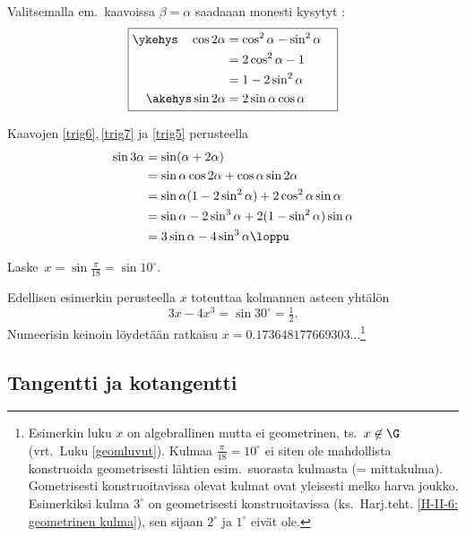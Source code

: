 Valitsemalla em.\ kaavoissa $\beta = \alpha$ saadaaan monesti kysytyt
:
\begin{equation} \label{trig7} \boxed{ \begin{aligned}
\ykehys\quad \cos 2\alpha &= \cos^2\alpha-\sin^2\alpha \quad \\ 
                          &= 2\cos^2 \alpha - 1 \\
                          &= 1-2\sin^2\alpha \quad \\
     \akehys \sin 2\alpha &= 2\sin \alpha \cos \alpha
\end{aligned} } \end{equation}
\begin{Exa} \label{sin kolme alpha} Kaavojen \eqref{trig6},\,\eqref{trig7} ja \eqref{trig5}
perusteella
\begin{align*}
\sin 3\alpha &= \sin (\alpha + 2\alpha) \\
&= \sin \alpha \cos 2\alpha + \cos \alpha \sin 2\alpha \\
&= \sin \alpha(1-2\sin^2 \alpha) + 2\cos^2 \alpha \sin \alpha \\
&= \sin \alpha - 2\sin^3 \alpha + 2(1-\sin^2 \alpha) \sin \alpha \\
&= 3\sin\alpha - 4\sin^3\alpha \loppu
\end{align*}
\end{Exa}
\begin{Exa} \label{kulman kolmijako}
Laske $\,x = \sin\frac{\pi}{18} = \sin 10^{\circ}$.
\end{Exa}
\ratk Edellisen esimerkin perusteella $x$ toteuttaa kolmannen asteen yhtälön
\[
3x - 4x^3 = \sin 30^{\circ} = \tfrac{1}{2}.
\]
Numeerisin keinoin löydetään ratkaisu $x=0.173648177669303 \ldots$\footnote[1]{Esimerkin luku
$x$ on algebrallinen mutta ei geometrinen, ts.\ $x \not\in\G$ (vrt.\ Luku \ref{geomluvut}). 
Kulmaa $\frac{\pi}{18} = 10^{\circ}$ ei siten ole mahdollista konstruoida geometrisesti lähtien
esim.\ suorasta kulmasta (= mittakulma). Gometrisesti konstruoitavissa olevat kulmat ovat 
yleisesti melko harva joukko. Esimerkiksi kulma $3^{\circ}$ on geometrisesti konstruoitavissa
(ks.\ Harj.teht. \ref{H-II-6: geometrinen kulma}), sen sijaan $2^{\circ}$ ja $1^{\circ}$ eivät
ole.} \loppu

\subsection*{Tangentti ja kotangentti}

